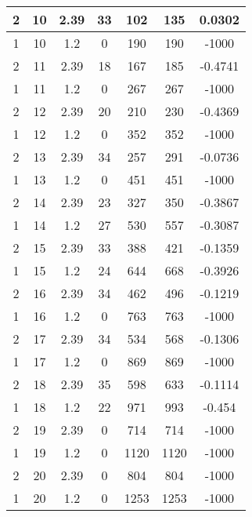 \documentclass[letterpaper, 12pt]{article}
\begin{document}
\begin{longtable}{|c|c|c|c|c|c|c|}
\hline
2 & 10 & 2.39 & 33 & 102 & 135 & 0.0302 \\
\hline
1 & 10 & 1.2 & 0 & 190 & 190 & -1000 \\
\hline
2 & 11 & 2.39 & 18 & 167 & 185 & -0.4741 \\
\hline
1 & 11 & 1.2 & 0 & 267 & 267 & -1000 \\
\hline
2 & 12 & 2.39 & 20 & 210 & 230 & -0.4369 \\
\hline
1 & 12 & 1.2 & 0 & 352 & 352 & -1000 \\
\hline
2 & 13 & 2.39 & 34 & 257 & 291 & -0.0736 \\
\hline
1 & 13 & 1.2 & 0 & 451 & 451 & -1000 \\
\hline
2 & 14 & 2.39 & 23 & 327 & 350 & -0.3867 \\
\hline
1 & 14 & 1.2 & 27 & 530 & 557 & -0.3087 \\
\hline
2 & 15 & 2.39 & 33 & 388 & 421 & -0.1359 \\
\hline
1 & 15 & 1.2 & 24 & 644 & 668 & -0.3926 \\
\hline
2 & 16 & 2.39 & 34 & 462 & 496 & -0.1219 \\
\hline
1 & 16 & 1.2 & 0 & 763 & 763 & -1000 \\
\hline
2 & 17 & 2.39 & 34 & 534 & 568 & -0.1306 \\
\hline
1 & 17 & 1.2 & 0 & 869 & 869 & -1000 \\
\hline
2 & 18 & 2.39 & 35 & 598 & 633 & -0.1114 \\
\hline
1 & 18 & 1.2 & 22 & 971 & 993 & -0.454 \\
\hline
2 & 19 & 2.39 & 0 & 714 & 714 & -1000 \\
\hline
1 & 19 & 1.2 & 0 & 1120 & 1120 & -1000 \\
\hline
2 & 20 & 2.39 & 0 & 804 & 804 & -1000 \\
\hline
1 & 20 & 1.2 & 0 & 1253 & 1253 & -1000 \\
\hline
\end{longtable}
\end{document}
